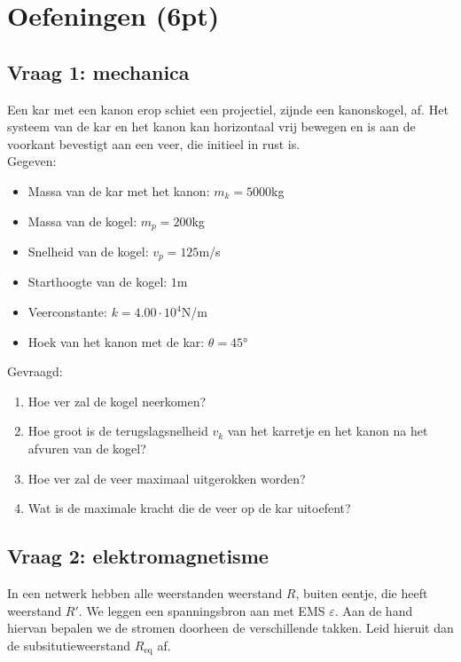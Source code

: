 \documentclass[kulak]{kulakarticle} %
\begin{document}
\newpage

\section{Oefeningen (6pt)}

\subsection{Vraag 1: mechanica}

Een kar met een kanon erop schiet een projectiel, zijnde een kanonskogel, af. Het systeem van de kar en het kanon kan horizontaal vrij bewegen en is aan de voorkant bevestigt aan een veer, die initieel in rust is.\\

\noindent Gegeven:

\begin{itemize}
	\item Massa van de kar met het kanon: \(m_k=5000\)\si{kg}
	\item Massa van de kogel: \(m_p = 200\)\si{kg}
	\item Snelheid van de kogel: \(v_p= 125\)\si{m/s}
	\item Starthoogte van de kogel: \(1\)\si{m}
	\item Veerconstante: \(k=4.00\cdot10^4\)\si{N/m}
	\item Hoek van het kanon met de kar: \(\theta=45\)°
\end{itemize}

\noindent Gevraagd:

\begin{enumerate}
	\item Hoe ver zal de kogel neerkomen?
	\item Hoe groot is de terugslagsnelheid \(v_k\) van het karretje en het kanon na het afvuren van de kogel?
	\item Hoe ver zal de veer maximaal uitgerokken worden?
	\item Wat is de maximale kracht die de veer op de kar uitoefent?
\end{enumerate}

\subsection{Vraag 2: elektromagnetisme}

In een netwerk hebben alle weerstanden weerstand \(R\), buiten eentje, die heeft weerstand \(R'\). We leggen een spanningsbron aan met EMS \(\varepsilon\). Aan de hand hiervan bepalen we de stromen doorheen de verschillende takken. Leid hieruit dan de subsitutieweerstand \(R_{\text{eq}}\) af.
\end{document}
